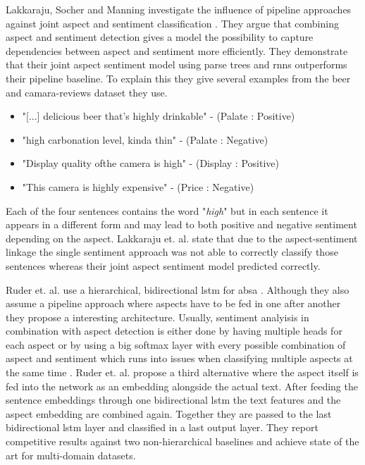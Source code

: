 Lakkaraju, Socher and Manning investigate the influence of pipeline approaches against joint aspect and sentiment classification \cite{Lakkaraju2014}. They argue that combining aspect and sentiment detection gives a model the possibility to capture dependencies between aspect and sentiment more efficiently. They demonstrate that their joint aspect sentiment model using parse trees and \glspl{rnn} outperforms their pipeline baseline. To explain this they give several examples from the beer \cite{McAuley2012, McAuley2013b} and camara-reviews dataset they use. 

\begin{itemize}
	\item "{[...]} delicious beer that’s highly drinkable" - {(Palate : Positive)}
	\item "high carbonation level, kinda thin" - {(Palate : Negative)}
	\item "Display quality ofthe camera is high" - {(Display : Positive)}
	\item "This camera is highly expensive" - {(Price : Negative)}
\end{itemize}

Each of the four sentences contains the word "\textit{high}" but in each sentence it appears in a different form and may lead to both positive and negative sentiment depending on the aspect. Lakkaraju et. al. state that due to the aspect-sentiment linkage the single sentiment approach was not able to correctly classify those sentences whereas their joint aspect sentiment model predicted correctly.
\medskip

Ruder et. al. use a hierarchical, bidirectional \gls{lstm} for \gls{absa} \cite{Ruder2016}. Although they also assume a pipeline approach where aspects have to be fed in one after another they propose a interesting architecture. Usually, sentiment analyisis in combination with aspect detection is either done by having multiple heads for each aspect \cite{Schmitt2018} or by using a big softmax layer with every possible combination of aspect and sentiment which runs into issues when classifying multiple aspects at the same time \cite{Lakkaraju2014}. Ruder et. al. propose a third alternative where the aspect itself is fed into the network as an embedding alongside the actual text. After feeding the sentence embeddings through one bidirectional \gls{lstm} the text features and the aspect embedding are combined again. Together they are passed to the last bidirectional \gls{lstm} layer and classified in a last output layer. They report competitive results against two non-hierarchical baselines and achieve state of the art for multi-domain datasets.
\medskip

